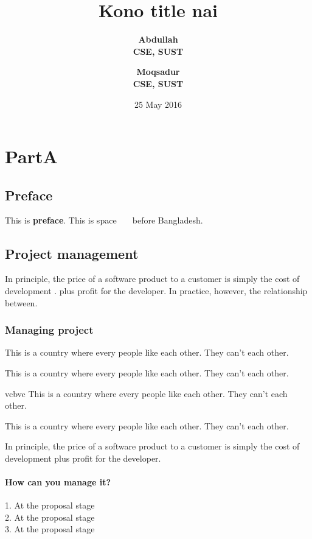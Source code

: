 \documentclass[oneside]{book}
\begin{document}
\frontmaker
\title{\bf Kono title nai}
\author{\bf Abdullah\\CSE, SUST \and \bf Moqsadur\\CSE, SUST}
\date{25 May 2016}
\maketitle
\tableofcontents
\mainmaker
\part{PartA}
\chapter{Preface}
This is {\bf preface}. This is space\verb+   + before Bangladesh.
\chapter{Project management}
In principle, the price of a software \cite{software} product to a customer is simply the cost of development 
. 
plus profit for the developer. In practice, however, the relationship between.
\section{Managing project}
\begin{large}
This is a country where every people like each other. They can't each other.
\end{large}
{\large This is a country where every people like each other. They can't each other. \par}
\begin{small}vcbvc
This is a country where every people like each other. They can't each other.
\end{small}
\begin{tiny}
This is a country where every people like each other. They can't each other.
\end{tiny}
In principle, the price of a software product to a customer \cite{customer} is simply the cost of development plus profit for the developer.
\subsection{How can you manage it?}
1. At the proposal stage\\
2. At the proposal stage\\
3. At the proposal stage\\
\end{document}
